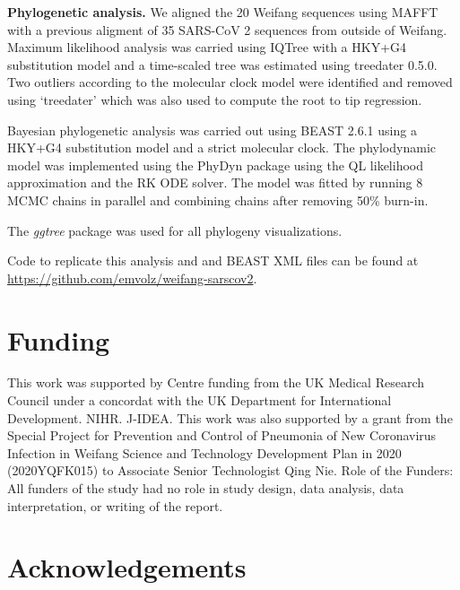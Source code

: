 \documentclass[9pt,lineno,onehalfspacing]{elife}
\begin{document}
{\flushleft\bf Phylogenetic analysis.} We aligned the 20 Weifang sequences using MAFFT\citep{katoh2013mafft} with a previous aligment of 35 SARS-CoV 2 sequences from outside of Weifang\citep{report5}. 
Maximum likelihood analysis was carried using IQTree\citep{Minh2019-bp} with a HKY+G4 substitution model and a time-scaled tree was estimated using treedater 0.5.0\citep{Volz2017-nz}. 
Two outliers according to the molecular clock model were identified and removed using `treedater' which was also used to compute the root to tip regression. 

Bayesian phylogenetic analysis was carried out using BEAST 2.6.1\citep{bouckaert2019beast} using a HKY+G4 substitution model and a strict molecular clock.
The phylodynamic model was implemented using the PhyDyn package\citep{Volz2018-mm} using the QL likelihood approximation and the RK ODE solver. 
The model was fitted by running 8 MCMC chains in parallel and combining chains after removing 50\% burn-in. 

The \emph{ggtree} package was used for all phylogeny visualizations\citep{Yu2017-iy}.

Code to replicate this analysis and and BEAST XML files can be found at \url{https://github.com/emvolz/weifang-sarscov2}. 

\section{Funding} %

This work was supported by Centre funding from the UK Medical Research Council under a concordat with the UK Department for International Development. NIHR. J-IDEA. This work was also supported by a grant from the Special Project for Prevention and Control of Pneumonia of New Coronavirus Infection in Weifang Science and Technology Development Plan in 2020 (2020YQFK015) to Associate Senior Technologist Qing Nie. 
Role of the Funders:  All funders of the study had no role in study design, data analysis, data interpretation, or writing of the report.


\section{Acknowledgements}
\end{document}
